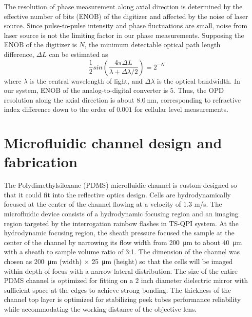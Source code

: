 \documentclass[aps,pra,reprint,longbibliography,groupedaddress]{revtex4-1}
\begin{document}
The resolution of phase measurement along axial direction is determined by the effective number of bits (ENOB) of the digitizer and affected by the noise of laser source. Since pulse-to-pulse intensity and phase fluctuations are small, noise from laser source is not the limiting factor in our phase measurements. Supposing the ENOB of the digitizer is $N$, the minimum detectable optical path length difference, $\Delta L$ can be estimated as
\begin{equation}
\frac{1}{2}sin\left(\frac{4\pi \Delta L}{\lambda + \Delta \lambda/2}\right)=2^{-N}
\end{equation}
where $\lambda$ is the central wavelength of light, and $\Delta\lambda$ is the optical bandwidth. In our system, ENOB of the analog-to-digital converter is $5$. Thus, the OPD resolution along the axial direction is about $\SI{8.0}{\nano\meter}$, corresponding to refractive index difference down to the order of $0.001$ for cellular level measurements.

\section*{Microfluidic channel design and fabrication}

The Polydimethylsiloxane (PDMS) microfluidic channel is custom-designed so that it could fit into the reflective optics design. Cells are hydrodynamically focused \cite{knight1998hydrodynamic,lee2006hydrodynamic} at the center of the channel flowing at a velocity of 1.3 m/s. The microfluidic device consists of a hydrodynamic focusing region and an imaging region targeted by the interrogation rainbow flashes in TS-QPI system. At the hydrodynamic focusing region, the sheath pressure focused the sample at the center of the channel by narrowing its flow width from \SI{200}{\micro\meter} to about \SI{40}{\micro\meter} with a sheath to sample volume ratio of 3:1. The dimension of the channel was chosen as \SI{200}{\micro\meter} (width) $\times$ \SI{25}{\micro\meter} (height) so that the cells will be imaged within depth of focus with a narrow lateral distribution. The size of the entire PDMS channel is optimized for fitting on a 2 inch diameter dielectric mirror with sufficient space at the edges to achieve strong bonding. The thickness of the channel top layer is optimized for stabilizing peek tubes performance reliability while accommodating the working distance of the objective lens. 
\end{document}
